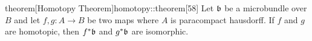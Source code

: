 \begin{mystatement}{theorem}[Homotopy Theorem]{homotopy::theorem}[58] Let $\bb$ be a microbundle over $B$ and let $f, g: A \to B$ be two maps where $A$ is paracompact hausdorff. If $f$ and $g$ are homotopic, then $\ind{f}\bb$ and $\ind{g}\bb$ are isomorphic. \end{mystatement}